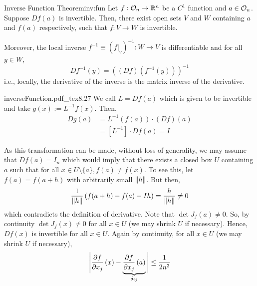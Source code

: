 \documentclass[../Analysis-3.tex]{subfiles}
\begin{document}
\begin{Thm}{Inverse Function Theorem}{inv:fun}
  Let $ f:\mathcal{O}_{n} \to \mathbb{R}^n $ be a $ C^1 $ function and $ a \in \mathcal{O}_{n} $. Suppose $ Df(a) $ is invertible. Then, there exist open sets $ V $ and $ W $ containing $ a $ and $ f(a) $ respectively, such that $ f: V \to W $ is invertible.

  \ssk

  Moreover, the local inverse $ f^{-1} \equiv \left( f\vert_{{}_V} \right)^{-1} : W \to V $ is differentiable and for all $ y \in W $,
  \[ Df^{-1}(y) = \left( \left( Df \right)\left( f^{-1}(y) \right) \right)^{-1} \]
  i.e., locally, the derivative of the inverse is the matrix inverse of the derivative.
\end{Thm}

\begin{proofFig}{\def\svgwidth{1.4in}
    {inverseFunction.pdf_tex}}{}{\label{fig:inf:fun}}{8}{.27\textwidth}
  We call $ L = Df(a) $ which is given to be invertible and take $ g(x) := L^{-1}f(x) $. Then,
  \begin{align*}
    Dg(a)
     & = L^{-1}(f(a))\cdot (Df)(a)            \\
     & = \left[ L^{-1} \right]\cdot Df(a) = I
  \end{align*}


  As this transformation can be made, without loss of generality, we may assume that $ Df(a) = I_n $ which would imply that there exists a closed box $ U $ containing $ a $ such that for all $ x\in U\setminus\{a\}, f(a) \not= f(x) $. To see this, let $ f(a) = f(a+h) $ with arbitrarily small $ \norm{h} $. But then,
  \[  \frac{1}{\norm{h}}\left( f(a+h)-f(a)-Ih \right) = \frac{h}{\norm{h}} \not= 0  \]
  which contradicts the definition of derivative. Note that $ \det J_f(a) \not= 0 $. So, by continuity $ \det J_f(x) \not= 0 $ for all $ x \in U $ (we may shrink $ U $ if necessary). Hence, $ Df(x) $ is invertible for all $ x \in U $. Again by continuity, for all $ x \in U $ (we may shrink $ U $ if necessary),
  \[  \Bigg\vert \pdv{f}{x_j}\left( x \right) - \underbrace{\pdv{f}{x_j}\left( a \right)}_{\delta_{ij}} \Bigg\vert \leq \frac{1}{2n^2}  \]


\end{proofFig}
\end{document}
